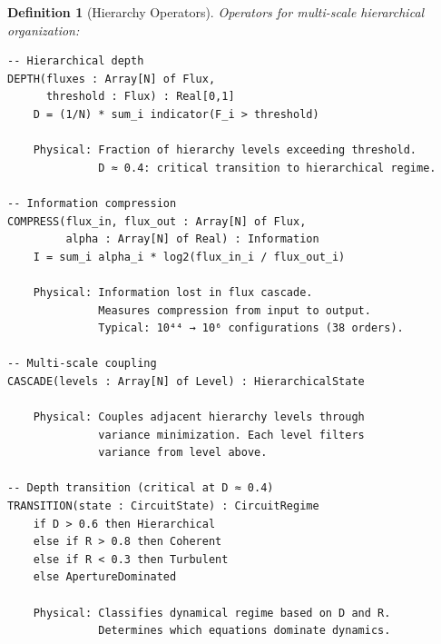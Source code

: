 \documentclass[aps,prd,twocolumn,superscriptaddress,floatfix,nofootinbib]{revtex4-2}
\newtheorem{definition}[theorem]{Definition}
\theoremstyle{remark}
\begin{document}
\begin{definition}[Hierarchy Operators]
\label{def:hierarchy_ops}
Operators for multi-scale hierarchical organization:
\begin{verbatim}
-- Hierarchical depth
DEPTH(fluxes : Array[N] of Flux,
      threshold : Flux) : Real[0,1]
    D = (1/N) * sum_i indicator(F_i > threshold)
    
    Physical: Fraction of hierarchy levels exceeding threshold.
              D ≈ 0.4: critical transition to hierarchical regime.

-- Information compression
COMPRESS(flux_in, flux_out : Array[N] of Flux,
         alpha : Array[N] of Real) : Information
    I = sum_i alpha_i * log2(flux_in_i / flux_out_i)
    
    Physical: Information lost in flux cascade.
              Measures compression from input to output.
              Typical: 10⁴⁴ → 10⁶ configurations (38 orders).

-- Multi-scale coupling
CASCADE(levels : Array[N] of Level) : HierarchicalState
    
    Physical: Couples adjacent hierarchy levels through
              variance minimization. Each level filters
              variance from level above.

-- Depth transition (critical at D ≈ 0.4)
TRANSITION(state : CircuitState) : CircuitRegime
    if D > 0.6 then Hierarchical
    else if R > 0.8 then Coherent
    else if R < 0.3 then Turbulent
    else ApertureDominated
    
    Physical: Classifies dynamical regime based on D and R.
              Determines which equations dominate dynamics.
\end{verbatim}
\end{definition}
\end{document}
